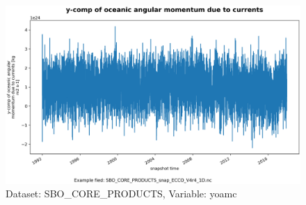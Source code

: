 \begin{figure}[H]
\centering
\includegraphics[scale=0.55]{../images/plots/oneD_plots/SBO_Core_Products/yoamc.png}
\caption{Dataset: SBO\_CORE\_PRODUCTS, Variable: yoamc}
\label{tab:table-SBO_CORE_PRODUCTS_yoamc-Plot}
\end{figure}
\pagebreak
